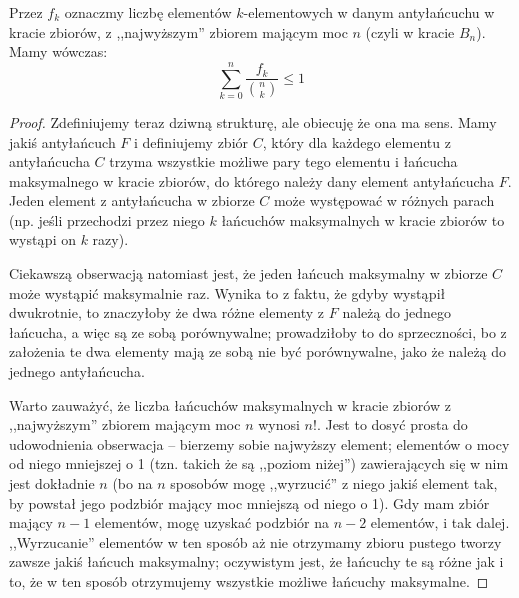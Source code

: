 \begin{theorem}
	Przez $f_k$ oznaczmy liczbę elementów $k$-elementowych w danym antyłańcuchu w kracie zbiorów, z ,,najwyższym'' zbiorem mającym moc $n$ (czyli w kracie $B_n$). Mamy wówczas:
	\begin{equation}
		\sum_{k=0}^{n} \frac{f_k}{\binom{n}{k}} \leq 1
	\end{equation}
\end{theorem}

\begin{proof}
	Zdefiniujemy teraz dziwną strukturę, ale obiecuję że ona ma sens. Mamy jakiś antyłańcuch $F$ i definiujemy zbiór $C$, który dla każdego elementu z antyłańcucha $C$ trzyma wszystkie możliwe pary tego elementu i łańcucha maksymalnego w kracie zbiorów, do którego należy dany element antyłańcucha $F$. Jeden element z antyłańcucha w zbiorze $C$ może występować w różnych parach (np. jeśli przechodzi przez niego $k$ łańcuchów maksymalnych w kracie zbiorów to wystąpi on $k$ razy).

	Ciekawszą obserwacją natomiast jest, że jeden łańcuch maksymalny w zbiorze $C$ może wystąpić maksymalnie raz. Wynika to z faktu, że gdyby wystąpił dwukrotnie, to znaczyłoby że dwa różne elementy z $F$ należą do jednego łańcucha, a więc są ze sobą porównywalne; prowadziłoby to do sprzeczności, bo z założenia te dwa elementy mają ze sobą nie być porównywalne, jako że należą do jednego antyłańcucha.

	Warto zauważyć, że liczba łańcuchów maksymalnych w kracie zbiorów z ,,najwyższym'' zbiorem mającym moc $n$ wynosi $n!$. Jest to dosyć prosta do udowodnienia obserwacja -- bierzemy sobie najwyższy element; elementów o mocy od niego mniejszej o 1 (tzn. takich że są ,,poziom niżej'') zawierających się w nim jest dokładnie $n$ (bo na $n$ sposobów mogę ,,wyrzucić'' z niego jakiś element tak, by powstał jego podzbiór mający moc mniejszą od niego o 1). Gdy mam zbiór mający $n-1$ elementów, mogę uzyskać podzbiór na $n-2$ elementów, i tak dalej. ,,Wyrzucanie'' elementów w ten sposób aż nie otrzymamy zbioru pustego tworzy zawsze jakiś łańcuch maksymalny; oczywistym jest, że łańcuchy te są różne jak i to, że w ten sposób otrzymujemy wszystkie możliwe łańcuchy maksymalne.


\end{proof}
